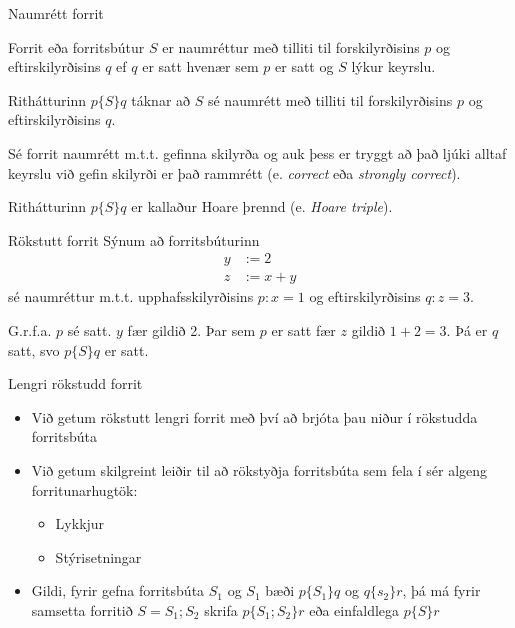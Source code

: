 \documentclass[handout]{beamer}
\begin{document}
\begin{frame}{Naumrétt forrit}
\begin{tcolorbox}[title=Naumrétt forrit]
Forrit eða forritsbútur $S$ er naumréttur með tilliti til forskilyrðisins $p$ og eftirskilyrðisins $q$ ef $q$ er satt hvenær sem $p$ er satt og $S$ lýkur keyrslu.

Rithátturinn $p\{S\}q$ táknar að $S$ sé naumrétt með tilliti til forskilyrðisins $p$ og eftirskilyrðisins $q$.
\end{tcolorbox}
Sé forrit naumrétt m.t.t. gefinna skilyrða og auk þess er tryggt að það ljúki alltaf keyrslu við gefin skilyrði er það rammrétt (e. \emph{correct} eða \emph{strongly correct}).

Rithátturinn $p\{S\}q$ er kallaður Hoare þrennd (e. \emph{Hoare triple}).
\end{frame}

\begin{frame}{Rökstutt forrit}
Sýnum að forritsbúturinn
\begin{align*}
y &:= 2\\
z &:= x + y
\end{align*}
sé naumréttur m.t.t. upphafsskilyrðisins $p: x = 1$ og eftirskilyrðisins $q: z = 3$. \pause

G.r.f.a. $p$ sé satt. $y$ fær gildið 2. Þar sem $p$ er satt fær $z$ gildið $1+2 = 3$. Þá er $q$ satt, svo $p\{S\}q$ er satt.
\end{frame}

\begin{frame}{Lengri rökstudd forrit}
\begin{itemize}
 \item Við getum rökstutt lengri forrit með því að brjóta þau niður í rökstudda forritsbúta
 \item Við getum skilgreint leiðir til að rökstyðja forritsbúta sem fela í sér algeng forritunarhugtök:
 \begin{itemize}
  \item Lykkjur
  \item Stýrisetningar
 \end{itemize}
 \item Gildi, fyrir gefna forritsbúta $S_1$ og $S_1$ bæði $p\{S_1\}q$ og $q\{s_2\}r$, þá má fyrir samsetta forritið $S = S_1;S_2$ skrifa $p\{S_1; S_2\}r$ eða einfaldlega $p\{S\}r$
\end{itemize}
\end{frame}
\end{document}
